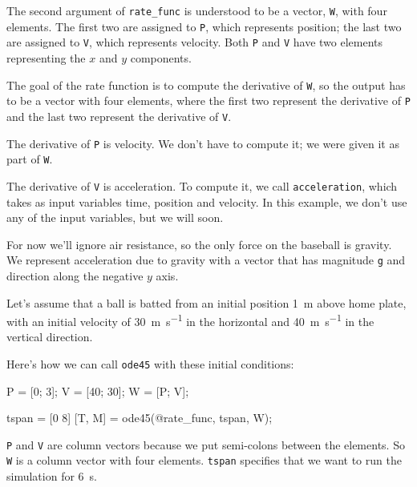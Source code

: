 \documentclass[
]{book}
\numberwithin{Answer}{chapter}
\numberwithin{Exercise}{chapter}
\begin{document}
The second argument of \verb"rate_func" is understood to be a vector,
{\tt W}, with four elements.  The first two are assigned to {\tt P},
which represents position; the last two are assigned to {\tt V}, which
represents velocity. Both {\tt P} and {\tt V} have two elements
representing the $x$ and $y$ components.


The goal of the rate function is to compute the derivative of {\tt W}, so the output has to be a vector with four elements, where the first two represent the derivative of {\tt P}  and the last two represent the derivative of {\tt V}.

The derivative of {\tt P} is velocity.  We don't have to compute it; we were given it as part of {\tt W}.

The derivative of {\tt V} is acceleration.  To compute it, we call {\tt acceleration}, which takes as input variables time, position and velocity.  In this example, we don't use any of the input variables, but we will soon.


For now we'll ignore air resistance, so the only force on the baseball is gravity.  We represent acceleration due to gravity with a vector that has magnitude {\tt g} and direction along the negative $y$ axis.

Let's assume that a ball is batted from an initial position \SI{1}{\meter} above home plate, with an initial velocity of \SI{30}{\meter\per\second} in the horizontal and \SI{40}{\meter\per\second} in the vertical direction.


Here's how we can call {\tt ode45} with these initial conditions:
 
\begin{code}
    P = [0; 3];       %
    V = [40; 30];     %
    W = [P; V];       %
    
    tspan = [0 8]
    [T, M] = ode45(@rate_func, tspan, W);
\end{code}

{\tt P} and {\tt V} are column vectors because we put semi-colons between the elements.  So {\tt W} is a column vector with four elements.
{\tt tspan} specifies that we want to run the simulation for \SI{6}{\second}.

\end{document}
